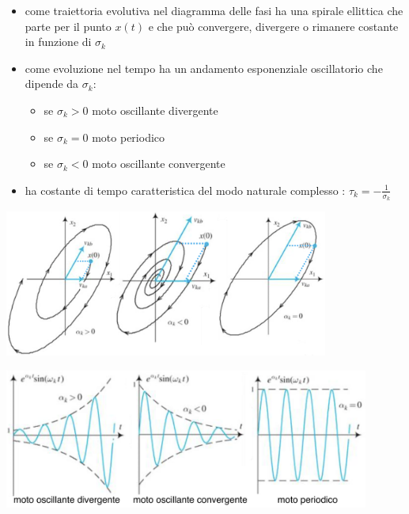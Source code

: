 \begin{center}
	\begin{minipage}{0.5\textwidth}
		\begin{itemize}
			\item come traiettoria evolutiva nel diagramma delle fasi ha una spirale ellittica che parte per il punto \(x(t)\)
			e che può convergere, divergere o rimanere costante in funzione di \(\sigma_k\)
			\item come evoluzione nel tempo ha un andamento esponenziale oscillatorio che dipende da \(\sigma_k\):
			\begin{itemize}
				\item se \(\sigma_k > 0\) moto oscillante divergente
				\item se \(\sigma_k = 0\) moto periodico 
				\item se \(\sigma_k < 0\) moto oscillante convergente
			\end{itemize}
			\item ha costante di tempo caratteristica del modo naturale complesso : \(\displaystyle\tau_k = -\frac{1}{\sigma_k}\)
		\end{itemize}
	\end{minipage}
	\begin{minipage}{0.49\textwidth}
		\centering
		\includegraphics[width=0.8\textwidth]{immagini/evoluzione libera complessa 1.png}
		\vspace{10pt}
		
		\includegraphics[width=0.9\textwidth]{immagini/evoluzione libera complessa 2.png}
	\end{minipage}
\end{center}

